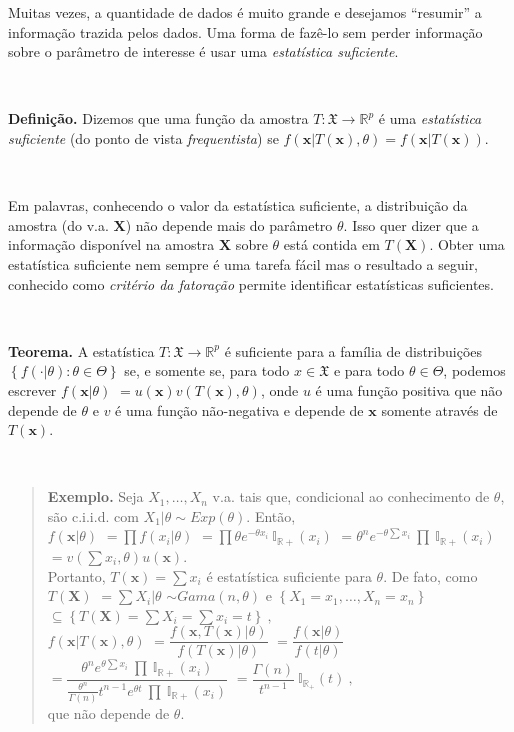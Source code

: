 \documentclass[
]{book}
\begin{document}
Muitas vezes, a quantidade de dados é muito grande e desejamos ``resumir'' a informação trazida pelos dados. Uma forma de fazê-lo sem perder informação sobre o parâmetro de interesse é usar uma \emph{estatística suficiente}.

\(~\)

\textbf{Definição.} Dizemos que uma função da amostra \(T:\mathfrak{X} \rightarrow \mathbb{R}^p\) é uma \emph{estatística suficiente} (do ponto de vista \emph{frequentista}) se \(f\left(\boldsymbol x | T(\boldsymbol x),\theta\right) = f\left(\boldsymbol x | T(\boldsymbol x)\right)\).

\(~\)

Em palavras, conhecendo o valor da estatística suficiente, a distribuição da amostra (do v.a. \(\boldsymbol X\)) não depende mais do parâmetro \(\theta\). Isso quer dizer que a informação disponível na amostra \(\boldsymbol X\) sobre \(\theta\) está contida em \(T(\boldsymbol X)\). Obter uma estatística suficiente nem sempre é uma tarefa fácil mas o resultado a seguir, conhecido como \emph{critério da fatoração} permite identificar estatísticas suficientes.

\(~\)

\textbf{Teorema.} A estatística \(T:\mathfrak{X} \rightarrow \mathbb{R}^p\) é suficiente para a família de distribuições \(\left\{f(\cdot|\theta):\theta \in \Theta\right\}\) se, e somente se, para todo \(x \in \mathfrak{X}\) e para todo \(\theta \in \Theta\), podemos escrever \(f\left(\boldsymbol x | \theta\right)\) \(= u(\boldsymbol x) v\left(T(\boldsymbol x),\theta\right)\), onde \(u\) é uma função positiva que não depende de \(\theta\) e \(v\) é uma função não-negativa e depende de \(\boldsymbol x\) somente através de \(T(\boldsymbol x)\).

\(~\)

\begin{quote}
\textbf{Exemplo.} Seja \(X_1,\ldots,X_n\) v.a. tais que, condicional ao conhecimento de \(\theta\), são c.i.i.d. com \(X_1|\theta \sim Exp(\theta)\). Então,\\
\(f(\boldsymbol x|\theta)\) \(=\prod f(x_i|\theta)\) \(=\prod \theta e^{-\theta x_i} ~\mathbb{I}_{\mathbb{R+}}(x_i)\) \(=\theta^n e^{-\theta \sum x_i} ~\prod ~\mathbb{I}_{\mathbb{R+}}(x_i)\) \(= v\left(\sum x_i, \theta\right) u(\boldsymbol x)\).\\
Portanto, \(T(\boldsymbol x) = \sum x_i\) é estatística suficiente para \(\theta\). De fato, como \(T(\boldsymbol X)\) \(= \sum X_i | \theta\) \(\sim Gama(n,\theta)\) e \(\left\{X_1=x_1,\ldots,X_n=x_n\right\}\) \(\subseteq \left\{T(\boldsymbol X) = \sum X_i = \sum x_i = t\right\}~,\)\\
\(f\left(\boldsymbol x| T(\boldsymbol x),\theta\right)\) \(=\dfrac{f\left(\boldsymbol{x},T(\boldsymbol{x})|\theta\right)}{f\left(T(\boldsymbol{x})|\theta\right)}\) \(=\dfrac{f\left(\boldsymbol{x}|\theta\right)}{f\left(t|\theta\right)}\) \(=\dfrac{\theta^n e^{\theta \sum x_i} ~\prod ~\mathbb{I}_{\mathbb{R+}}(x_i)}{\frac{\theta^n}{\Gamma(n)}t^{n-1} e^{\theta t} ~\prod ~\mathbb{I}_{\mathbb{R+}}(x_i)}\) \(= \dfrac{\Gamma(n)}{t^{n-1}} ~\mathbb{I}_{\mathbb{R}_+}\left(t\right)~,\)\\
que não depende de \(\theta\).
\end{quote}
\end{document}
